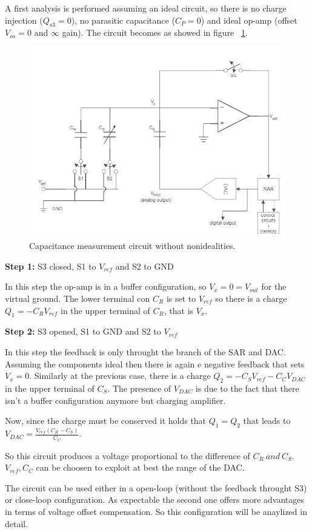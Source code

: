 A first analysis is performed assuming an ideal circuit, so there is no charge injection ($Q_{s3} = 0$), no parasitic capacitance ($C_P = 0$) and ideal op-amp (offset $V_{os} = 0$ and $\infty$ gain). The circuit becomes as showed in figure \Fig~\ref{fig:IdealCircuit}.
\begin{figure}[h]
	\centering
	\includegraphics[width=0.5\linewidth]{ImageFiles/IdealCircuit}
	\caption{Capacitance measurement circuit without nonidealities.}
	\label{fig:IdealCircuit}
\end{figure}

\clearpage

\textbf{Step 1:} S3 closed, S1 to $V_{ref}$ and S2 to GND

In this step the op-amp is in a buffer configuration, so $V_x = 0 = V_{out}$ for the virtual ground. The lower terminal con $C_R$ is set to $V_{ref}$ so there is a charge $Q_1 = -C_R V_{ref}$ in the upper terminal of $C_R$, that is $V_x$.

\textbf{Step 2:} S3 opened, S1 to GND and S2 to $V_{ref}$

In this step the feedback is only throught the branch of the SAR and DAC. Assuming the components ideal then there is again e negative feedback that sets $V_x = 0$. Similarly at the previous case, there is a charge $Q_2 = -C_S V_{ref} - C_C V_{DAC}$ in the upper terminal of $C_S$. The presence of $V_{DAC}$ is due to the fact that there isn't a buffer configuration anymore but charging amplifier.

Now, since the charge must be conserved it holds that $Q_1 = Q_2$ that leads to $V_{DAC} = \frac{V_{ref}(C_R - C_S)}{C_C}$. 

So this circuit produces a voltage proportional to the difference of $C_R \ and \ C_S$. $V_{ref},C_C$ can be choosen to exploit at best the range of the DAC.

The circuit can be used either in a open-loop (without the feedback throught S3) or close-loop configuration. As expectable the second one offers more advantages in terms of voltage offset compensation. So this configuration will be anaylized in detail.